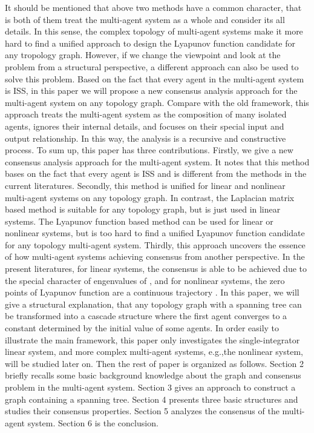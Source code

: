 \documentclass[english]{cccconf}
\begin{document}
It should be mentioned that above two methods have a common character, that is both of them treat the multi-agent system as a whole and consider its all details. In this sense, the complex topology of  multi-agent systems make it more hard to find a unified approach to design the Lyapunov function candidate for  any tropology graph. However, if we change the viewpoint and look at the problem from a structural perspective, a different approach can also be used to solve this problem. Based on the fact that every agent in the multi-agent system is ISS, in this paper we will propose a new consensus analysis approach for the multi-agent system on any topology graph. Compare with the old framework, this approach treats the multi-agent system as the composition of many isolated agents, ignores their internal details, and focuses on their special  input and output relationship. In this way, the analysis is a recursive and constructive process. To sum up, this paper has three contributions. Firstly, we give a new consensus analysis approach for the multi-agent system. It notes that this method bases on the fact that every agent is ISS and is different from the methods in the current literatures.  Secondly, this method is unified for linear and nonlinear  multi-agent systems on any topology graph. In contrast, the  Laplacian matrix  based method is suitable for any topology graph, but is just used in linear systems. The Lyapunov function based method can be used for linear or nonlinear systems, but is too hard to find a unified Lyapunov function candidate for any topology multi-agent system. Thirdly,  this approach uncovers the essence of how multi-agent systems achieving consensus from another perspective. In the present literatures, for linear systems, the consensus is able to be achieved  due to the  special character of  engenvalues of ,  and for nonlinear systems, the zero points of  Lyapunov function are a continuous trajectory . In this paper, we will give a structural explanation, that any topology graph with a spanning tree can be transformed into a cascade structure where the first agent converges to a constant determined by the initial value of  some agents. In order easily to  illustrate the main framework, this paper only investigates  the single-integrator linear system, and  more complex multi-agent systems, e.g.,the nonlinear system, will be studied later on. Then the rest of paper is organized as follows. Section 2 briefly recalls some basic background knowledge about the graph and consensus problem in the multi-agent system. Section 3 gives an approach to construct a graph containing a spanning tree. Section 4 presents three basic structures and studies their consensus properties. Section 5 analyzes the consensus of the multi-agent system. Section 6 is the conclusion.
\end{document}
